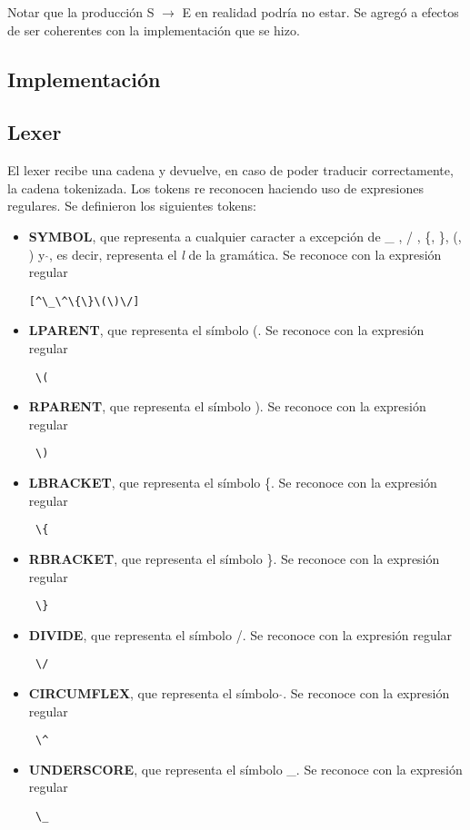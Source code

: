 \indent Notar que la producción  S $\rightarrow$ E en realidad podría no estar. Se agregó a efectos de ser coherentes con la implementación que se hizo.\\ 

\subsection{Implementación}

\subsection{Lexer}

\indent \indent El lexer recibe una cadena y devuelve, en caso de poder traducir correctamente, la cadena tokenizada. Los tokens re reconocen haciendo uso de expresiones regulares. Se definieron los siguientes tokens:\\
\begin{itemize}
\item \textbf{SYMBOL}, que representa a cualquier caracter a excepción de \_ , / , \{, \}, (, ) y  $\hat{}$, es decir, representa el \textit{l} de la gramática. Se reconoce con la expresión regular \begin{verbatim}[^\_\^\{\}\(\)\/]\end{verbatim}
\item \textbf{LPARENT}, que representa el símbolo (. Se reconoce con la expresión regular \begin{verbatim} \(\end{verbatim}
\item \textbf{RPARENT}, que representa el símbolo ).  Se reconoce con la expresión regular \begin{verbatim} \) \end{verbatim}
\item \textbf{LBRACKET}, que representa el símbolo \{.  Se reconoce con la expresión regular \begin{verbatim} \{\end{verbatim}
\item \textbf{RBRACKET}, que representa el símbolo \}.  Se reconoce con la expresión regular \begin{verbatim} \}\end{verbatim}
\item \textbf{DIVIDE}, que representa el símbolo /.  Se reconoce con la expresión regular \begin{verbatim} \/\end{verbatim}
\item \textbf{CIRCUMFLEX}, que representa el símbolo $\hat{}$.  Se reconoce con la expresión regular \begin{verbatim} \^ \end{verbatim}
\item \textbf{UNDERSCORE}, que representa el símbolo \_.  Se reconoce con la expresión regular \begin{verbatim} \_ \end{verbatim}
\end{itemize}

